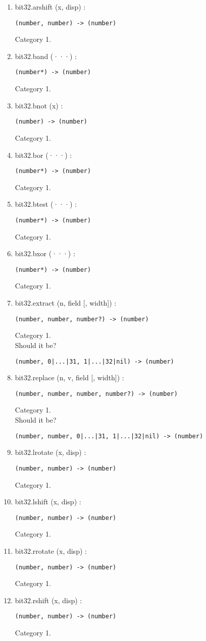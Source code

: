 \begin{enumerate}
\item bit32.arshift (x, disp) :
\begin{verbatim}
(number, number) -> (number)
\end{verbatim}
Category 1.
\item bit32.band (···) :
\begin{verbatim}
(number*) -> (number)
\end{verbatim}
Category 1.
\item bit32.bnot (x) :
\begin{verbatim}
(number) -> (number)
\end{verbatim}
Category 1.
\item bit32.bor (···) :
\begin{verbatim}
(number*) -> (number)
\end{verbatim}
Category 1.
\item bit32.btest (···) :
\begin{verbatim}
(number*) -> (number)
\end{verbatim}
Category 1.
\item bit32.bxor (···) :
\begin{verbatim}
(number*) -> (number)
\end{verbatim}
Category 1.
\item bit32.extract (n, field [, width]) :
\begin{verbatim}
(number, number, number?) -> (number)
\end{verbatim}
Category 1.
\\
Should it be?
\begin{verbatim}
(number, 0|...|31, 1|...|32|nil) -> (number)
\end{verbatim}
\item bit32.replace (n, v, field [, width]) :
\begin{verbatim}
(number, number, number, number?) -> (number)
\end{verbatim}
Category 1.
\\
Should it be?
\begin{verbatim}
(number, number, 0|...|31, 1|...|32|nil) -> (number)
\end{verbatim}
\item bit32.lrotate (x, disp) :
\begin{verbatim}
(number, number) -> (number)
\end{verbatim}
Category 1.
\item bit32.lshift (x, disp) :
\begin{verbatim}
(number, number) -> (number)
\end{verbatim}
Category 1.
\item bit32.rrotate (x, disp) :
\begin{verbatim}
(number, number) -> (number)
\end{verbatim}
Category 1.
\item bit32.rshift (x, disp) :
\begin{verbatim}
(number, number) -> (number)
\end{verbatim}
Category 1.
\end{enumerate}

